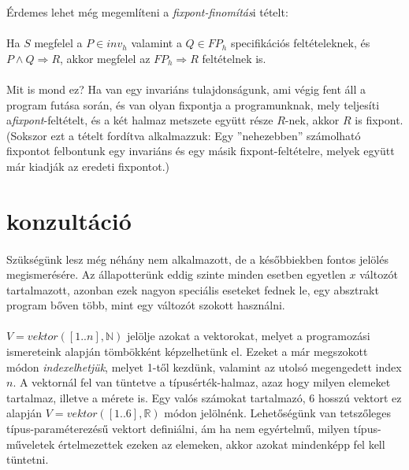 \documentclass[12pt]{article}
\begin{document}
	Érdemes lehet még megemlíteni a \textit{fixpont-finomítás}i tételt:
	\paragraph{}
	Ha $S$ megfelel a $P \in inv_h$ valamint a $ Q \in FP_h$ specifikációs feltételeknek, és $P \land Q \Rightarrow R$, akkor megfelel az $FP_h \Rightarrow R$ feltételnek is.
	\paragraph{}
	Mit is mond ez? Ha van egy invariáns tulajdonságunk, ami végig fent áll a program futása során, és van olyan fixpontja a programunknak, mely teljesíti a\textit{fixpont}-feltételt, és a két halmaz metszete együtt része $R$-nek, akkor $R$ is fixpont. (Sokszor ezt a tételt fordítva alkalmazzuk: Egy ''nehezebben'' számolható fixpontot felbontunk egy invariáns és egy másik fixpont-feltételre, melyek együtt már kiadják az eredeti fixpontot.)
	
	
	
	
	\section{konzultáció}
	\paragraph{}Szükségünk lesz még néhány nem alkalmazott, de a későbbiekben fontos jelölés megismerésére. Az állapotterünk eddig szinte minden esetben egyetlen $x$ változót tartalmazott, azonban ezek nagyon speciális eseteket fednek le, egy absztrakt program bőven több, mint egy változót szokott használni.
	\paragraph{}
	$V = vektor([1..n], \mathbb{N})$ jelölje azokat a vektorokat, melyet a programozási ismereteink alapján tömbökként képzelhetünk el. Ezeket a már megszokott módon \textit{indexelhetjük}, melyet 1-től kezdünk, valamint az utolsó megengedett index $n$. A vektornál fel van tüntetve a típusérték-halmaz, azaz hogy milyen elemeket tartalmaz, illetve a mérete is. Egy valós számokat tartalmazó, 6 hosszú vektort ez alapján $V = vektor([1..6], \mathbb{R})$ módon jelölnénk. Lehetőségünk van tetszőleges típus-paraméterezésű vektort definiálni, ám ha nem egyértelmű, milyen típus-műveletek értelmezettek ezeken az elemeken, akkor azokat mindenképp fel kell tüntetni.
	
\end{document}
